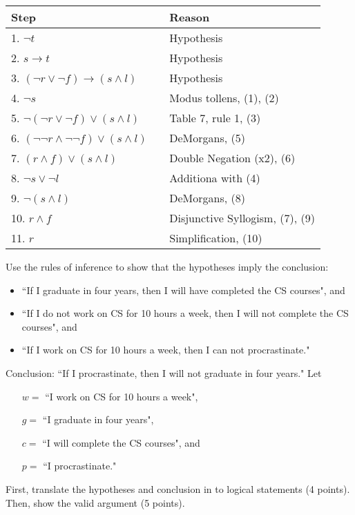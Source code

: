 \documentclass[10pt,addpoints]{exam}
\newcommand{\ra}{\rightarrow}
\begin{document}
\begin{questions}
\begin{solution}
    \begin{tabular}{lll}
        Step   & \hspace{0.2in}     & Reason \\
        \hline
        1. $\neg t$                 &   & Hypothesis \\
        2. $s \ra t$                &   & Hypothesis \\
        3. $(\neg r \vee \neg f) \ra (s \wedge l)$  &   & Hypothesis \\
        4. $\neg s$                 &   & Modus tollens, (1), (2) \\
        5. $\neg (\neg r \vee \neg f) \vee (s \wedge l) $  & & Table 7, rule 1, (3) \\
        6. $(\neg \neg r \wedge \neg \neg f) \vee (s \wedge l)$  & & DeMorgans,  (5) \\
        7. $(r \wedge f) \vee (s \wedge l)$     & & Double Negation (x2), (6) \\
        8. $\neg s \vee \neg l$     &   & Additiona with (4) \\
        9. $\neg (s \wedge l)$      &   & DeMorgans, (8) \\
        10. $r \wedge f$            &   & Disjunctive Syllogism, (7), (9) \\
        11. $r$                     &   & Simplification, (10)
    \end{tabular}
\end{solution}



\question[9]\label{probc} Use the rules of inference to show that the hypotheses imply the conclusion:
\begin{itemize}[itemsep=0pt,parsep=0pt,topsep=0pt,partopsep=0pt]
    \item ``If I graduate in four years, then I will have completed the CS courses", and
    \item ``If I do not work on CS for 10 hours a week, then I will not complete the CS courses", and
    \item ``If I work on CS for 10 hours a week, then I can not procrastinate."
\end{itemize}
Conclusion: ``If I procrastinate, then I will not graduate in four years."
Let
\begin{itemize}[itemsep=0pt,parsep=0pt,topsep=0pt,partopsep=0pt]
    \item[$w = $] ``I work on CS for 10 hours a week",
    \item[$g = $] ``I graduate in four years",
    \item[$c = $] ``I will complete the CS courses", and
    \item[$p = $] ``I procrastinate."
\end{itemize}
First, translate the hypotheses and conclusion in to logical statements (4 points).  Then, show the valid argument (5 points).


\end{questions}
\end{document}
